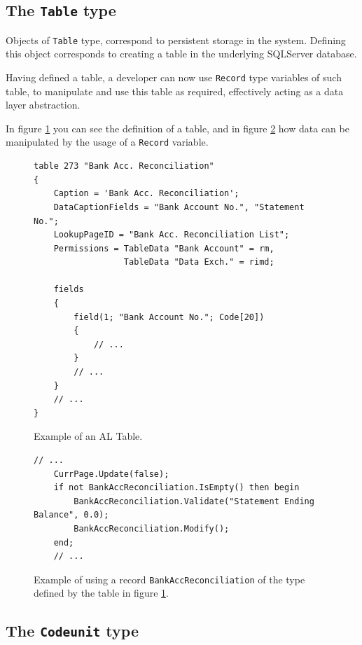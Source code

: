 \subsection{The \texttt{Table} type}

Objects of \texttt{Table} type, correspond to persistent storage in the system. Defining this object corresponds
to creating a table in the underlying SQLServer database.

Having defined a table, a developer can now use \texttt{Record} type variables of such table,
to manipulate and use this table as required, effectively acting as a data layer abstraction.

In figure \ref{f:app-al-table-alcode} you can see the definition of a table, and in figure \ref{f:app-al-record-usage}
how data can be manipulated by the usage of a \texttt{Record} variable.

\begin{figure}
    \begin{Verbatim}[fontsize=\tiny]
table 273 "Bank Acc. Reconciliation"
{
    Caption = 'Bank Acc. Reconciliation';
    DataCaptionFields = "Bank Account No.", "Statement No.";
    LookupPageID = "Bank Acc. Reconciliation List";
    Permissions = TableData "Bank Account" = rm,
                  TableData "Data Exch." = rimd;

    fields
    {
        field(1; "Bank Account No."; Code[20])
        {
            // ...
        }
        // ...
    }
    // ...
}
    \end{Verbatim}
    \caption{Example of an AL Table.}
    \label{f:app-al-table-alcode}
\end{figure}

\begin{figure}
    \begin{Verbatim}[fontsize=\tiny]
    // ...
    CurrPage.Update(false);
    if not BankAccReconciliation.IsEmpty() then begin
        BankAccReconciliation.Validate("Statement Ending Balance", 0.0);
        BankAccReconciliation.Modify();
    end;
    // ...
    \end{Verbatim}
    \caption{Example of using a record \texttt{BankAccReconciliation} of the type defined by the table in figure \ref{f:app-al-table-alcode}.}
    \label{f:app-al-record-usage}
\end{figure}

\subsection{The \texttt{Codeunit} type}


